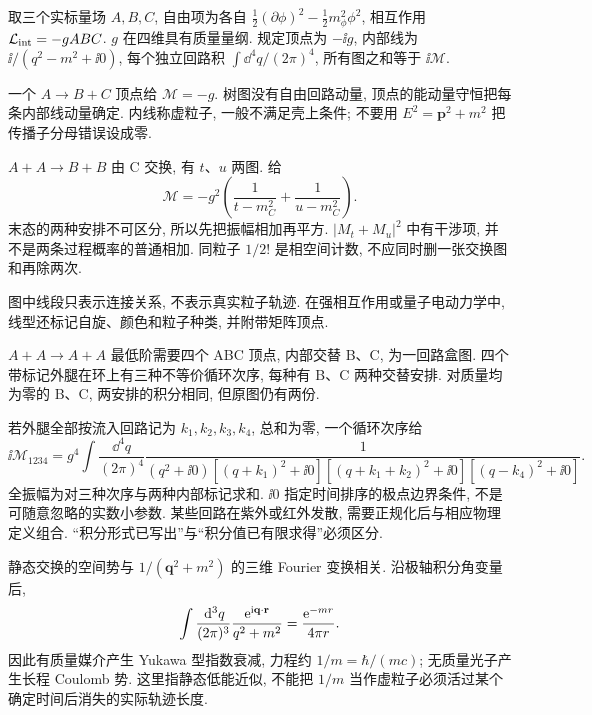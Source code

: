 \label{ch:feynman}
取三个实标量场 $A,B,C$, 自由项为各自 $\tfrac12(\partial\phi)^2-\tfrac12m_\phi^2\phi^2$, 相互作用 $\mathcal L_{\rm int}=-gABC$. $g$ 在四维具有质量量纲. 规定顶点为 $-\ii g$, 内部线为 $\ii/(q^2-m^2+\ii0)$, 每个独立回路积 $\int\dd^4q/(2\pi)^4$, 所有图之和等于 $\ii\mathcal M$.

一个 $A\to B+C$ 顶点给 $\mathcal M=-g$. 树图没有自由回路动量, 顶点的能动量守恒把每条内部线动量确定. 内线称虚粒子, 一般不满足壳上条件; 不要用 $E^2=\mathbf p^2+m^2$ 把传播子分母错误设成零.

$A+A\to B+B$ 由 C 交换, 有 $t$、$u$ 两图. 给
\begin{equation}
 \mathcal M=-g^2\left(\frac1{t-m_C^2}+\frac1{u-m_C^2}\right).
\end{equation}
末态的两种安排不可区分, 所以先把振幅相加再平方. $|M_t+M_u|^2$ 中有干涉项, 并不是两条过程概率的普通相加. 同粒子 $1/2!$ 是相空间计数, 不应同时删一张交换图和再除两次.

\begin{center}
\end{center}
图中线段只表示连接关系, 不表示真实粒子轨迹. 在强相互作用或量子电动力学中, 线型还标记自旋、颜色和粒子种类, 并附带矩阵顶点.

$A+A\to A+A$ 最低阶需要四个 ABC 顶点, 内部交替 B、C, 为一回路盒图. 四个带标记外腿在环上有三种不等价循环次序, 每种有 B、C 两种交替安排. 对质量均为零的 B、C, 两安排的积分相同, 但原图仍有两份.

若外腿全部按流入回路记为 $k_1,k_2,k_3,k_4$, 总和为零, 一个循环次序给
\begin{equation}
 \ii\mathcal M_{1234}=g^4\int\frac{\dd^4q}{(2\pi)^4}
 \frac1{(q^2+\ii0)[(q+k_1)^2+\ii0][(q+k_1+k_2)^2+\ii0][(q-k_4)^2+\ii0]}.
\end{equation}
全振幅为对三种次序与两种内部标记求和. $\ii0$ 指定时间排序的极点边界条件, 不是可随意忽略的实数小参数. 某些回路在紫外或红外发散, 需要正规化后与相应物理定义组合. ``积分形式已写出''与``积分值已有限求得''必须区分.

静态交换的空间势与 $1/(\mathbf q^2+m^2)$ 的三维 Fourier 变换相关. 沿极轴积分角变量后,
\begin{equation}
 \int\frac{\,\mathrm d^3q}{(2\pi)^3}\frac{\mathrm e^{\mathrm i\mathbf q\cdot\mathbf r}}{q^2+m^2}
 =\frac{\mathrm e^{-mr}}{4\pi r}.
\end{equation}
因此有质量媒介产生 Yukawa 型指数衰减, 力程约 $1/m=\hbar/(mc)$; 无质量光子产生长程 Coulomb 势. 这里指静态低能近似, 不能把 $1/m$ 当作虚粒子必须活过某个确定时间后消失的实际轨迹长度.
